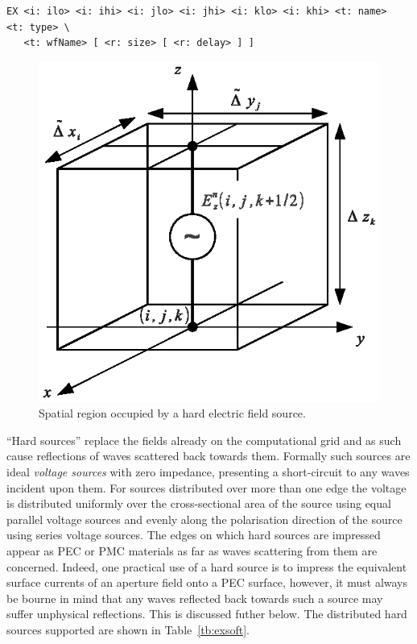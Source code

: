 \documentclass[onecolumn,a4paper]{article}
\numberwithin{equation}{section}
\begin{document}
\begin{verbatim}
EX <i: ilo> <i: ihi> <i: jlo> <i: jhi> <i: klo> <i: khi> <t: name>  <t: type> \
   <t: wfName> [ <r: size> [ <r: delay> ] ]
\end{verbatim}

\begin{figure}[ht]
  \begin{center}
   \includegraphics[width=0.4\linewidth]{figures/volt_src}
  \end{center}
  \vspace{-5mm}
  \caption{\label{fg:volt_src}Spatial region occupied by a hard electric field source.}
\end{figure}

``Hard sources'' replace the fields already on the computational
grid and as such cause reflections of waves scattered back towards them. 
Formally such sources are ideal {\em voltage sources} with zero impedance,
presenting a short-circuit to any waves incident upon them.
For sources distributed over more than one edge the voltage is distributed uniformly over
the cross-sectional area of the source using equal parallel voltage sources and evenly 
along the polarisation direction of the source using series voltage sources.
The edges on which hard sources are impressed appear as PEC or PMC materials
as far as waves scattering from them are concerned. Indeed, one practical
use of a hard source is to impress the equivalent surface currents of an 
aperture field onto a PEC surface, however, it must always be bourne in mind
that any waves reflected back towards such a source may suffer unphysical 
reflections. This is discussed futher below.
The distributed hard sources supported are shown in Table~\ref{tb:exsoft}.
\end{document}

